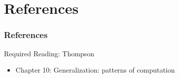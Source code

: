 \documentclass[dvipsnames]{beamer}
\theoremstyle{plain}
\begin{document}

\section*{References}

\begin{frame}
  \frametitle{References}

  \begin{block}{Required Reading: Thompson}
    \begin{itemize}
      \item Chapter 10: \alert{Generalization: patterns of computation}
    \end{itemize}
  \end{block}
\end{frame}
\end{document}
